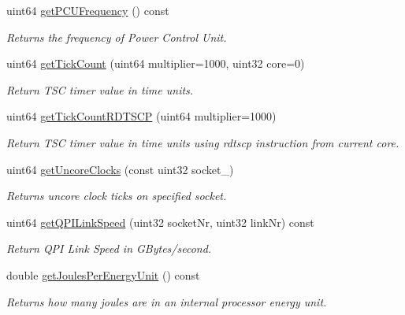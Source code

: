 \begin{DoxyCompactItemize}
\mbox{\label{class_p_c_m_a9911d0d2edf17ecffd24ffce5a31a982}} 
uint64 \mbox{\hyperlink{class_p_c_m_a9911d0d2edf17ecffd24ffce5a31a982}{get\+P\+C\+U\+Frequency}} () const
\begin{DoxyCompactList}\small\item\em Returns the frequency of Power Control Unit. \end{DoxyCompactList}\item 
uint64 \mbox{\hyperlink{class_p_c_m_a794f5852662a2827b34eb16025564c70}{get\+Tick\+Count}} (uint64 multiplier=1000, uint32 core=0)
\begin{DoxyCompactList}\small\item\em Return T\+SC timer value in time units. \end{DoxyCompactList}\item 
uint64 \mbox{\hyperlink{class_p_c_m_a0d5153c7ec05003da7d20aeea737113e}{get\+Tick\+Count\+R\+D\+T\+S\+CP}} (uint64 multiplier=1000)
\begin{DoxyCompactList}\small\item\em Return T\+SC timer value in time units using rdtscp instruction from current core. \end{DoxyCompactList}\item 
\mbox{\label{class_p_c_m_a09ea813c4cd70d3f7fe73cf1e0aca706}} 
uint64 \mbox{\hyperlink{class_p_c_m_a09ea813c4cd70d3f7fe73cf1e0aca706}{get\+Uncore\+Clocks}} (const uint32 socket\+\_\+)
\begin{DoxyCompactList}\small\item\em Returns uncore clock ticks on specified socket. \end{DoxyCompactList}\item 
uint64 \mbox{\hyperlink{class_p_c_m_a9bfa5b2f12f2e98382f9d8ddbc0c02e1}{get\+Q\+P\+I\+Link\+Speed}} (uint32 socket\+Nr, uint32 link\+Nr) const
\begin{DoxyCompactList}\small\item\em Return Q\+PI Link Speed in G\+Bytes/second. \end{DoxyCompactList}\item 
\mbox{\label{class_p_c_m_ae933960b6244fe1d96ec4306a61c0e3a}} 
double \mbox{\hyperlink{class_p_c_m_ae933960b6244fe1d96ec4306a61c0e3a}{get\+Joules\+Per\+Energy\+Unit}} () const
\begin{DoxyCompactList}\small\item\em Returns how many joules are in an internal processor energy unit. \end{DoxyCompactList}\item 

\end{DoxyCompactItemize}
